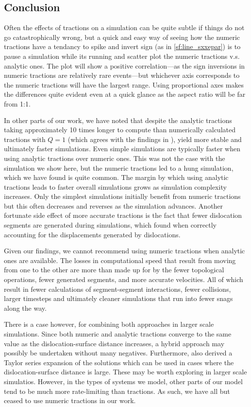 \subsection{Conclusion}\label{ss:paperConclusion}

Often the effects of tractions on a simulation can be quite subtle if things do not go catastrophically wrong, but a quick and easy way of seeing how the numeric tractions have a tendancy to spike and invert sign (as in \cref{sf:line_sxxepar}) is to pause a simulation while its running and scatter plot the numeric tractions v.s. analytic ones. The plot will show a positive correlation---as the sign inversions in numeric tractions are relatively rare events---but whichever axis corresponds to the numeric tractions will have the largest range. Using proportional axes makes the differences quite evident even at a quick glance as the aspect ratio will be far from 1:1.

In other parts of our work, we have noted that despite the analytic tractions taking approximately 10 times longer to compute than numerically calculated tractions with $Q = 1$ (which agrees with the findings in \cite{analytic_tractions}), yield more stable and ultimately faster simulations. Even simple simulations are typically faster when using analytic tractions over numeric ones. This was not the case with the simulation we show here, but the numeric tractions led to a hung simulation, which we have found is quite common. The margin by which using analytic tractions leads to faster overall simulations grows as simulation complexity increases. Only the simplest simulations initially benefit from numeric tractions but this often decreases and reverses as the simulation advances. Another fortunate side effect of more accurate tractions is the fact that fewer dislocation segments are generated during simulations, which \citet{bromage2018calculating} found when correctly accounting for the displacements generated by dislocations.

Given our findings, we cannot recommend using numeric tractions when analytic ones are available. The losses in computational speed that result from moving from one to the other are more than made up for by the fewer topological operations, fewer generated segments, and more accurate velocities. All of which result in fewer calculations of segment-segment interactions, fewer collisions, larger timesteps and ultimately cleaner simulations that run into fewer snags along the way.

There is a case however, for combining both approaches in larger scale simulations. Since both numeric and analytic tractions converge to the same value as the dislocation-surface distance increases, a hybrid approach may possibly be undertaken without many negatives. Furthermore, \cite{analytic_tractions} also derived a Taylor series expansion of the solutions which can be used in cases where the dislocation-surface distance is large. These may be worth exploring in larger scale simulatios. However, in the types of systems we model, other parts of our model tend to be much more rate-limiting than tractions. As such, we have all but ceased to use numeric tractions in our work.

